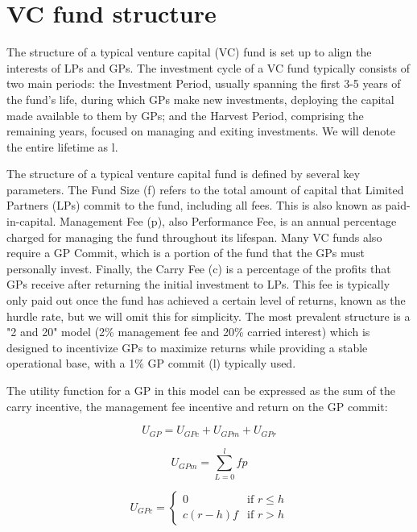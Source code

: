 \documentclass[a4paper, oneside]{discothesis}
\begin{document}
\section{VC fund structure}

The structure of a typical venture capital (VC) fund is set up to align the interests of LPs and GPs. The investment cycle of a VC fund typically consists of two main periods: the Investment Period, usually spanning the first 3-5 years of the fund's life, during which GPs make new investments, deploying the capital made available to them by GPs; and the Harvest Period, comprising the remaining years, focused on managing and exiting investments. We will denote the entire lifetime as l. 

The structure of a typical venture capital fund is defined by several key parameters. The Fund Size (f) refers to the total amount of capital that Limited Partners (LPs) commit to the fund, including all fees. This is also known as paid-in-capital. Management Fee (p), also Performance Fee, is an annual percentage charged for managing the fund throughout its lifespan. Many VC funds also require a GP Commit, which is a portion of the fund that the GPs must personally invest. Finally, the Carry Fee (c) is a percentage of the profits that GPs receive after returning the initial investment to LPs. This fee is typically only paid out once the fund has achieved a certain level of returns, known as the hurdle rate, but we will omit this for simplicity. The most prevalent structure is a "2 and 20" model (2\% management fee and 20\% carried interest) which is designed to incentivize GPs to maximize returns while providing a stable operational base, with a 1\% GP commit (l) typically used. 

The utility function for a GP in this model can be expressed as the sum of the carry incentive, the management fee incentive and return on the GP commit:

\begin{equation}
U_{GP} = U_{GPc} + U_{GPm} + U_{GPr}
\end{equation}

\begin{equation}
U_{GPm} = \sum_{L=0}^l fp
\end{equation}

\begin{equation}
U_{GPc} = \begin{cases}
    0 & \text{if } r \leq h \\
    c(r-h)f & \text{if } r > h
    \end{cases}
\end{equation}
\end{document}
